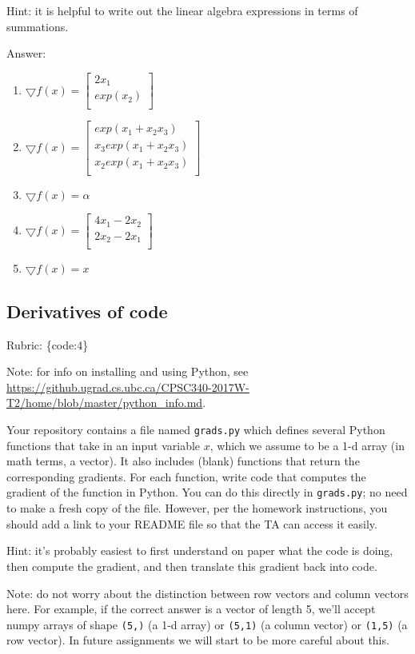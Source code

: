 \documentclass{article}
\def\rubric#1{\gre{Rubric: \{#1\}}}{}
\def\blu#1{{\color{blu}#1}}
\def\gre#1{{\color{gre}#1}}
\def\enum#1{\begin{enumerate}#1\end{enumerate}}
\begin{document}
Hint: it is helpful to write out the linear algebra expressions in terms of summations.
\textcolor{gre}{
Answer:
\enum{
\item  $\bigtriangledown f(x)=\left[\begin{array}{c}
2x_1\\
exp(x_2)\\
\end{array}\right]$
\item  $\bigtriangledown f(x)=\left[\begin{array}{c}
exp(x_1+x_2x_3)\\
x_3exp(x_1+x_2x_3)\\
x_2exp(x_1+x_2x_3)\\
\end{array}\right]$
\item $\bigtriangledown f(x)=\alpha$
\item  $\bigtriangledown f(x)=\left[\begin{array}{c}
4x_1-2x_2\\
2x_2-2x_1\\
\end{array}\right]$
\item $\bigtriangledown f(x)=x$
}
}



\subsection{Derivatives of code}

\rubric{code:4}

Note: for info on installing and using Python, see \url{https://github.ugrad.cs.ubc.ca/CPSC340-2017W-T2/home/blob/master/python_info.md}.

Your repository contains a file named \texttt{grads.py} which defines several Python functions that take in an input variable $x$, which we assume to be a 1-d array (in math terms, a vector).
It also includes (blank) functions that return the corresponding gradients.
For each function, \blu{write code that computes the gradient of the function} in Python.
You can do this directly in \texttt{grads.py}; no need to make a fresh copy of the file. However, per the homework instructions, you should add a link to your README file so that the TA can access it easily.

Hint: it's probably easiest to first understand on paper what the code is doing, then compute
the gradient, and then translate this gradient back into code.

Note: do not worry about the distinction between row vectors and column vectors here.
For example, if the correct answer is a vector of length 5, we'll accept numpy arrays
of shape \texttt{(5,)} (a 1-d array) or \texttt{(5,1)} (a column vector) or
\texttt{(1,5)} (a row vector). In future assignments we will start to be more careful
about this.
\end{document}
